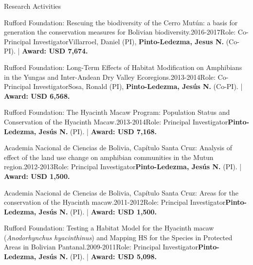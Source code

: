 \documentclass{resume} %
\begin{document}
\begin{rSection}{Research Activities}
\begin{pSubsection}{Rufford Foundation: }{Rescuing the biodiversity of the Cerro Mutún: a basis for generation the conservation measures for Bolivian biodiversity.}{2016-2017}{Role: Co-Principal Investigator}{Villarroel, Daniel (PI), \textbf{Pinto-Ledezma, Jesus N.} (Co-PI). | {\bf Award: USD 7,674.}}
\end{pSubsection}

\begin{pSubsection}{Rufford Foundation: }{Long-Term Effects of Habitat Modification on Amphibians in the Yungas and Inter-Andean Dry Valley Ecoregions.}{2013-2014}{Role: Co-Principal Investigator}{Sosa, Ronald (PI), \textbf{Pinto-Ledezma, Jesús N.} (Co-PI). | {\bf Award: USD 6,568.}}
\end{pSubsection}

\begin{pSubsection}{Rufford Foundation: }{The Hyacinth Macaw Program: Population Status and Conservation of the Hyacinth Macaw.}{2013-2014}{Role: Principal Investigator}{\textbf{Pinto-Ledezma, Jesús N.} (PI). | {\bf Award: USD 7,168.}}
\end{pSubsection}

\begin{pSubsection}{Academia Nacional de Ciencias de Bolivia, Capítulo Santa Cruz: }{Analysis of effect of the land use change on amphibian communities in the Mutun region.}{2012-2013}{Role: Principal Investigator}{\textbf{Pinto-Ledezma, Jesús N.} (PI). | {\bf Award: USD 1,500.}}
\end{pSubsection}

\begin{pSubsection}{Academia Nacional de Ciencias de Bolivia, Capítulo Santa Cruz: }{Areas for the conservation of the Hyacinth macaw.}{2011-2012}{Role: Principal Investigator}{\textbf{Pinto-Ledezma, Jesús N.} (PI). | {\bf Award: USD 1,500.}}
\end{pSubsection}

\begin{pSubsection}{Rufford Foundation: }{Testing a Habitat Model for the Hyacinth macaw (\emph{Anodorhynchus hyacinthinus}) and Mapping HS for the Species in Protected Areas in Bolivian Pantanal.}{2009-2011}{Role: Principal Investigator}{\textbf{Pinto-Ledezma, Jesús N.} (PI). | {\bf Award: USD 5,098.}}
\end{pSubsection}

\end{rSection}


\end{document}
